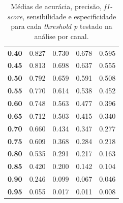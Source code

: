 \begin{table}[h]
\begin{tiny}
\begin{tabular}{|l|l|l|l|l|}
\cellcolor[HTML]{EFEFEF}\textbf{0.40}   &  0.827               & 0.730                     & 0.678                    & 0.595            \\ \cline{1-5}
\cellcolor[HTML]{EFEFEF}\textbf{0.45}   &  0.813               & 0.698                     & 0.637                    & 0.555            \\ \cline{1-5}
\cellcolor[HTML]{EFEFEF}\textbf{0.50}   &  0.792               & 0.659                     & 0.591                    & 0.508            \\ \cline{1-5}
\cellcolor[HTML]{EFEFEF}\textbf{0.55}   &  0.770               & 0.614                     & 0.538                    & 0.452            \\ \cline{1-5} 
\cellcolor[HTML]{EFEFEF}\textbf{0.60}   &  0.748               & 0.563                     & 0.477                    & 0.396            \\ \cline{1-5}
\cellcolor[HTML]{EFEFEF}\textbf{0.65}   &  0.712               & 0.503                     & 0.415                    & 0.340            \\ \cline{1-5}
\cellcolor[HTML]{EFEFEF}\textbf{0.70}   &  0.660               & 0.434                     & 0.347                    & 0.277            \\ \cline{1-5}
\cellcolor[HTML]{EFEFEF}\textbf{0.75}   &  0.609               & 0.368                     & 0.284                    & 0.218            \\ \cline{1-5} 
\cellcolor[HTML]{EFEFEF}\textbf{0.80}   &  0.535               & 0.291                     & 0.217                    & 0.163            \\ \cline{1-5}
\cellcolor[HTML]{EFEFEF}\textbf{0.85}   &  0.420               & 0.200                     & 0.142                    & 0.104            \\ \cline{1-5}
\cellcolor[HTML]{EFEFEF}\textbf{0.90}   &  0.246               & 0.099                     & 0.067                    & 0.046            \\ \cline{1-5}
\cellcolor[HTML]{EFEFEF}\textbf{0.95}   &  0.055               & 0.017                     & 0.011                    & 0.008            \\ \cline{1-5}
\end{tabular}
\end{tiny}
\caption{Médias de acurácia, precisão, \textit{f1-score}, sensibilidade e especificidade para cada \textit{threshold p} testado na análise por canal.}
    \label{tab:metricas-variando-p-por-canal}
\end{table}

